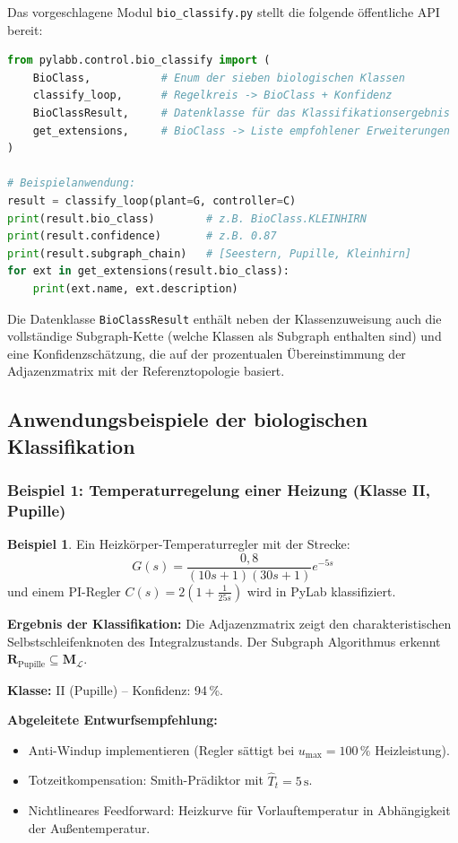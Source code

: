 \documentclass[a4paper,12pt]{article}
\theoremstyle{definition}
\newtheorem{beispiel}{Beispiel}
\begin{document}
Das vorgeschlagene Modul \texttt{bio\_classify.py} stellt die
folgende öffentliche API bereit:

\begin{lstlisting}[language=Python, caption=Öffentliche API des biologischen Klassifikationsmoduls]
from pylabb.control.bio_classify import (
	BioClass,           # Enum der sieben biologischen Klassen
	classify_loop,      # Regelkreis -> BioClass + Konfidenz
	BioClassResult,     # Datenklasse für das Klassifikationsergebnis
	get_extensions,     # BioClass -> Liste empfohlener Erweiterungen
)

# Beispielanwendung:
result = classify_loop(plant=G, controller=C)
print(result.bio_class)        # z.B. BioClass.KLEINHIRN
print(result.confidence)       # z.B. 0.87
print(result.subgraph_chain)   # [Seestern, Pupille, Kleinhirn]
for ext in get_extensions(result.bio_class):
	print(ext.name, ext.description)
\end{lstlisting}

Die Datenklasse \texttt{BioClassResult} enthält neben der Klassenzuweisung
auch die vollstän\-dige Subgraph-Kette (welche Klassen als Subgraph enthalten
sind) und eine Konfidenzschätzung, die auf der prozentualen Übereinstimmung
der Adjazenzmatrix mit der Referenztopologie basiert.

\subsection{Anwendungsbeispiele der biologischen Klassifikation}
\label{subsec:bio_beispiele}

\subsubsection{Beispiel 1: Temperaturregelung einer Heizung (Klasse II, Pupille)}

\begin{beispiel}
	Ein Heizkörper-Temperaturregler mit der Strecke:
	\[
	G(s) = \frac{0{,}8}{(10s+1)(30s+1)} e^{-5s}
	\]
	und einem PI-Regler $C(s) = 2\left(1 + \frac{1}{25s}\right)$ wird in PyLab
	klassifiziert.
	
	\textbf{Ergebnis der Klassifikation:}
	Die Adjazenzmatrix zeigt den charakteristischen Selbstschleifenknoten des
	Integralzustands. Der Subgraph Algorithmus erkennt $\mathbf{R}_{\text{Pupille}}
	\subseteq \mathbf{M}_\mathcal{L}$.
	
	\textbf{Klasse:} II (Pupille) -- Konfidenz: 94\,\%.
	
	\textbf{Abgeleitete Entwurfsempfehlung:}
	\begin{itemize}
		\item Anti-Windup implementieren (Regler sättigt bei $u_{\max} = 100\,\%$
		Heizleistung).
		\item Totzeitkompensation: Smith-Prädiktor mit $\hat{T}_t = 5\,\text{s}$.
		\item Nichtlineares Feedforward: Heizkurve für Vorlauftemperatur in
		Abhängigkeit der Außentemperatur.
	\end{itemize}
\end{beispiel}
\end{document}
